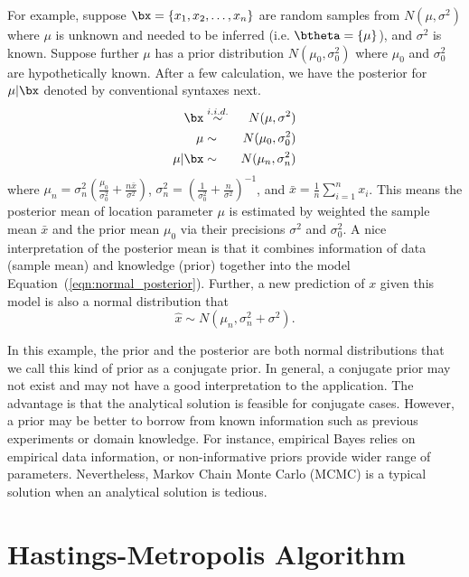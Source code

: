 For example, suppose $\bx = \{x_1, x_2, \ldots, x_n\}$ are random samples from
$N(\mu, \sigma^2)$ where $\mu$ is unknown and needed to be inferred
(i.e. $\btheta = \{\mu\}$), and
$\sigma^2$ is known. Suppose further $\mu$ has a prior distribution
$N(\mu_0, \sigma_0^2)$ where $\mu_0$ and $\sigma_0^2$ are hypothetically known.
After a few calculation, we have the posterior for $\mu | \bx$
denoted by conventional syntaxes next.
\begin{eqnarray}
\bx & \stackrel{i.i.d.}{\sim} & N(\mu, \sigma^2)
  \label{eqn:normal_likelihood} \\
\mu & \sim & N(\mu_0, \sigma_0^2) \label{eqn:normal_prior} \\
\mu|\bx & \sim & N(\mu_n, \sigma_n^2) \label{eqn:normal_posterior}
\end{eqnarray}
where
$\mu_n = \sigma_n^2
       \left(\frac{\mu_0}{\sigma_0^2} + \frac{n\bar{x}}{\sigma^2} \right)$,
$\sigma_n^2
 = \left(\frac{1}{\sigma_0^2} + \frac{n}{\sigma^2} \right)^{-1}$,
and $\bar{x} = \frac{1}{n} \sum_{i = 1}^n x_i$.
This means the posterior mean of location parameter $\mu$ is estimated by
weighted the sample mean $\bar{x}$ and the prior mean $\mu_0$ via their
precisions $\sigma^2$ and $\sigma_0^2$. A nice interpretation of the posterior
mean is that it combines information of data (sample mean) and knowledge (prior)
together into the model Equation~(\ref{eqn:normal_posterior}).
Further, a new prediction of $x$ given this model is also a normal
distribution that
\begin{equation}
\hat{x} \sim N(\mu_n, \sigma_n^2 + \sigma^2).
\label{eqn:normal_prediction}
\end{equation}

In this example, the prior and the posterior are both normal distributions
that we call this kind of prior as a conjugate prior.
In general, a conjugate prior may
not exist and may not have a good interpretation to the application.
The advantage is that the analytical solution is feasible for conjugate
cases. However, a prior may be better to borrow from known information such as
previous experiments or domain knowledge. For instance, empirical Bayes
relies on empirical data information, or non-informative priors provide
wider range of parameters. Nevertheless,
Markov Chain Monte Carlo (MCMC)
is a typical solution when an analytical solution is tedious.


\section{Hastings-Metropolis Algorithm}

